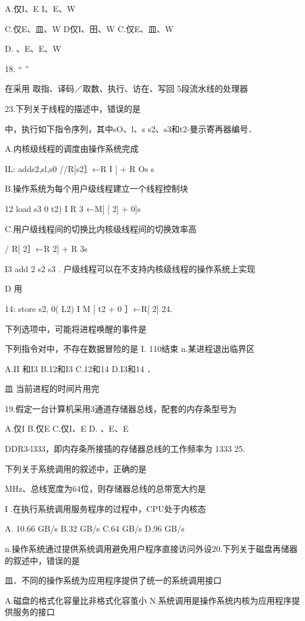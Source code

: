    A.仅I、E    I、E、W

   C.仅E、皿、W    D仅I、田、W    C.仅E、皿、W

    D.  、E、E、W

18.    “    ”

   在采用 取指、译码／取数、执行、访在、写回 5段流水线的处理器

    23.下列关于线程的描述中，错误的是

   中，执行如下指令序列，其中sO、l、s  s2、s3和t2-曼示寄再器编号．

    A.内核级线程的调度由操作系统完成

   IL:   adds2,sl,s0     //R[s2］←R  I ] + R  Os     s

    B.操作系统为每个用户级线程建立一个线程控制块

   12    load s3  0  t2)     I  R  3 ←M[ [ 2] + 0]s

    C.用户级线程间的切换比内核级线程间的切换效率高

    /  R[ 2］←R  2] + R  3s

   I3    add 2  s2  s3    .   户级线程可以在不支持内核级线程的操作系统上实现

    D 用

   14:   store s2, 0( L2)     I  M [   t2  + 0 ］←R[ 2]    24.

    下列选项中，可能将进程唤醒的事件是

   下列指令对中，不存在数据冒险的是    I. 110结束    n.某进程退出临界区

   A.II 和I3    B.12和I3    C.12和14    D.I3和14    ．

    皿 当前进程的时间片用完

19.假定一台计算机采用3通道存储器总线，配套的内存条型号为

    A.仅I    B.仅E    C.仅I、E    D. 、E、E

   DDR3-l333，即内存条所接插的存储器总线的工作频率为 1333    25.

    下列关于系统调用的叙述中，正确的是

   MHz、总线宽度为64位，则存储器总线的总带宽大约是

    I .在执行系统调用服务程序的过程中，CPU处于内核态

   A. 10.66 GB/s    B.32 GB/s    C.64 GB/s    D.96 GB/s

    n.操作系统通过提供系统调用避免用户程序直接访问外设20.下列关于磁盘再储器的叙述中，错误的是

    皿．不同的操作系统为应用程序提供了统一的系统调用接口

   A.磁盘的格式化容量比非格式化容茧小    N.系统调用是操作系统内核为应用程序提供服务的接口

